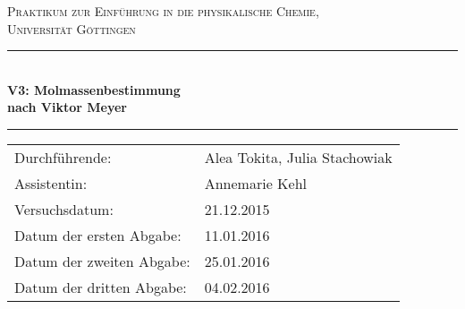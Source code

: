 \documentclass[12pt,a4paper,titlepage,headinclude,bibtotoc]{scrartcl}
\begin{document}
\begin{titlepage}
\centering
\textsc{\Large Praktikum zur Einführung in die physikalische Chemie,\\[1.5ex] Universität Göttingen}

\vspace*{2cm}

\rule{\textwidth}{1pt}\\[0.5cm]
{\huge \bfseries
  V3: Molmassenbestimmung\\[1.5ex]
  nach Viktor Meyer}\\[0.5cm]
\rule{\textwidth}{1pt}

\vspace*{1cm}


\begin{Large}
\begin{tabular}{ll}
Durchführende: &  Alea Tokita, Julia Stachowiak\\
Assistentin: & Annemarie Kehl\\
 Versuchsdatum: & 21.12.2015\\
 Datum der ersten Abgabe: & 11.01.2016\\
 Datum der zweiten Abgabe: & 25.01.2016      \\
 Datum der dritten Abgabe: & 04.02.2016\\
\end{tabular}
\end{Large}

\vspace*{2cm}

\begin{Large}
\end{Large}

\end{titlepage}

\tableofcontents

\newpage
\end{document}
